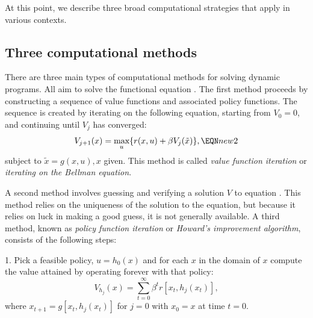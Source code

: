 \medskip


At this point, we describe three broad computational
strategies that apply in various contexts.

\subsection{Three computational methods}

There are three main  types of
computational methods for solving dynamic programs.
All aim to solve the functional equation
.
\medskip
{}
 The first method proceeds by constructing
a sequence of value functions and associated policy
functions.  The sequence is created by iterating on the following
equation, starting from $V_0=0$, and continuing until $V_j$ has
converged:
$$V_{j+1}(x) =\max_u \{r(x,u)+\be V_j(\tilde x)\},\EQN new2$$
subject to $\tilde x=g(x,u), x$ given.
This method is called {\it value function iteration\/} or
{\it iterating on the Bellman equation}.

\medskip
{} 
 A second method involves guessing and verifying a solution $V$
to equation .  This method relies on the uniqueness
of the solution to the equation, but because it relies on luck
in making a good guess, it is not generally available.
\medskip
{}
%
A third method, known as {\it policy function iteration} or {\it Howard's
improvement algorithm},
consists of the following steps:
\medskip
\item{1.} Pick a feasible policy, $u = h_0(x)$ and for each $x$ in the domain of $x$
 compute
the value attained by operating forever with that policy:
$$ V_{h_j}(x) = \sum_{t=0}^\infty \beta^t r[x_t, h_j(x_t)]  ,$$
where $x_{t+1} = g[x_t, h_j(x_t)]$ for $j=0$ with $x_0 = x$ at time $t=0$.

